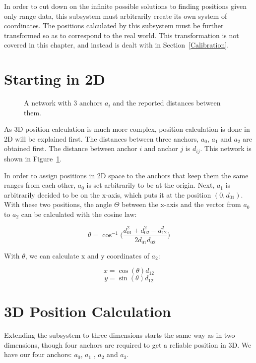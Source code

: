In order to cut down on the infinite possible solutions to finding positions given only range data, this subsystem must arbitrarily create its own system of coordinates. The positions calculated by this subsystem must be further transformed so as to correspond to the real world. This transformation is not covered in this chapter, and instead is dealt with in Section~\ref{Calibration}.

\section{Starting in 2D}
\label{HighLevelExample}

\begin{figure}
	\centering
	
	\decoRule
	\caption{A network with 3 anchors $a_i$ and the reported distances between them.}
	\label{fig:PositionCalculationNetwork}
\end{figure}

As 3D position calculation is much more complex, position calculation is done in 2D will be explained first. The distances between three anchors, $a_{0}$, $ a_{1}$  and $a_{2}$ are obtained first. The distance between anchor $i$ and anchor $j$ is $d_{ij}$. This network is shown in Figure~\ref{fig:PositionCalculationNetwork}.

In order to assign positions in 2D space to the anchors that keep them the same ranges from each other, $a_{0}$ is set arbitrarily to be at the origin. Next, $a_{1}$ is arbitrarily decided to be on the x-axis, which puts it at the position $(0, d_{01})$. With these two positions, the angle $\Theta$ between the x-axis and the vector from $a_0$ to $a_2$ can be calculated with the cosine law:

\[ \theta = \cos ^{-1}\Big(\frac{d_{01}^2 + d_{02}^2 - d_{12}^2 }{2 d_{01} d_{02}}\Big)\]

With $\theta$, we can calculate x and y coordinates of $a_2$:

\[ x = \cos(\theta) d_{12} \]
\[ y = \sin(\theta) d_{12} \]

\section{3D Position Calculation}
Extending the subsystem to three dimensions starts the same way as in two dimensions, though four anchors are required to get a reliable position in 3D. We have our four anchors: $a_{0}$, $a_{1}$ , $a_{2}$ and $a_{3}$. 

